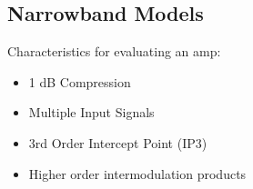 \documentclass[12pt]{article}
\begin{document}
\subsection{Narrowband Models}

Characteristics for evaluating an amp:
\begin{itemize}[noitemsep]
    \item 1 dB Compression
    \item Multiple Input Signals
    \item 3rd Order Intercept Point (IP3)
    \item Higher order intermodulation products
\end{itemize}
\end{document}
